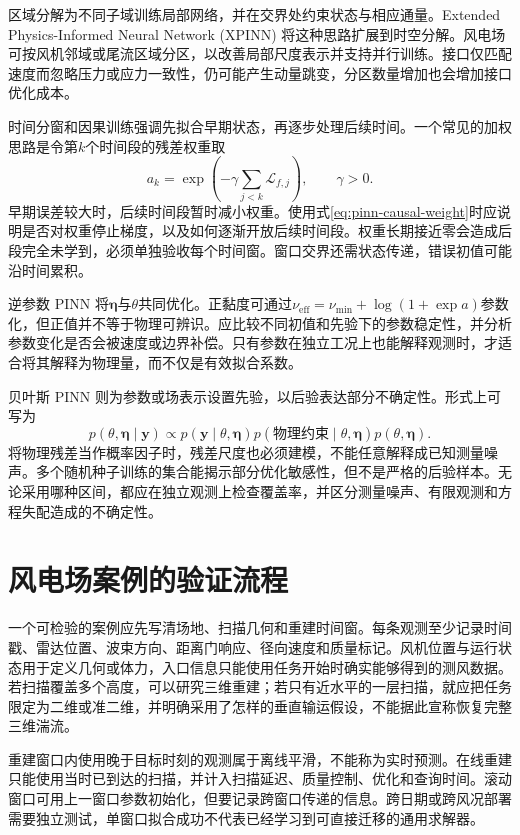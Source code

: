 区域分解为不同子域训练局部网络，并在交界处约束状态与相应通量。Extended Physics-Informed Neural Network (XPINN) 将这种思路扩展到时空分解\cite{jagtap2020xpinn}。风电场可按风机邻域或尾流区域分区，以改善局部尺度表示并支持并行训练。接口仅匹配速度而忽略压力或应力一致性，仍可能产生动量跳变，分区数量增加也会增加接口优化成本。

时间分窗和因果训练强调先拟合早期状态，再逐步处理后续时间。一个常见的加权思路是令第$k$个时间段的残差权重取
\begin{equation}
 a_k=\exp\left(-\gamma\sum_{j<k}\mathcal L_{f,j}\right),\qquad \gamma>0.\label{eq:pinn-causal-weight}
\end{equation}
早期误差较大时，后续时间段暂时减小权重。使用式\eqref{eq:pinn-causal-weight}时应说明是否对权重停止梯度，以及如何逐渐开放后续时间段。权重长期接近零会造成后段完全未学到，必须单独验收每个时间窗。窗口交界还需状态传递，错误初值可能沿时间累积。

逆参数 PINN 将$\boldsymbol\eta$与$\theta$共同优化。正黏度可通过$\nu_{\mathrm{eff}}=\nu_{\min}+\log(1+\exp a)$参数化，但正值并不等于物理可辨识。应比较不同初值和先验下的参数稳定性，并分析参数变化是否会被速度或边界补偿。只有参数在独立工况上也能解释观测时，才适合将其解释为物理量，而不仅是有效拟合系数。

贝叶斯 PINN 则为参数或场表示设置先验，以后验表达部分不确定性\cite{yang2021bpinn}。形式上可写为
\begin{equation}
 p(\theta,\boldsymbol\eta\mid\mathbf y)
 \propto p(\mathbf y\mid\theta,\boldsymbol\eta)
 p(\text{物理约束}\mid\theta,\boldsymbol\eta)
 p(\theta,\boldsymbol\eta).
\end{equation}
将物理残差当作概率因子时，残差尺度也必须建模，不能任意解释成已知测量噪声。多个随机种子训练的集合能揭示部分优化敏感性，但不是严格的后验样本。无论采用哪种区间，都应在独立观测上检查覆盖率，并区分测量噪声、有限观测和方程失配造成的不确定性。

\section{风电场案例的验证流程}
\label{sec:pinn-validation}
一个可检验的案例应先写清场地、扫描几何和重建时间窗。每条观测至少记录时间戳、雷达位置、波束方向、距离门响应、径向速度和质量标记。风机位置与运行状态用于定义几何或体力，入口信息只能使用任务开始时确实能够得到的测风数据。若扫描覆盖多个高度，可以研究三维重建；若只有近水平的一层扫描，就应把任务限定为二维或准二维，并明确采用了怎样的垂直输运假设，不能据此宣称恢复完整三维湍流。

重建窗口内使用晚于目标时刻的观测属于离线平滑，不能称为实时预测。在线重建只能使用当时已到达的扫描，并计入扫描延迟、质量控制、优化和查询时间。滚动窗口可用上一窗口参数初始化，但要记录跨窗口传递的信息。跨日期或跨风况部署需要独立测试，单窗口拟合成功不代表已经学习到可直接迁移的通用求解器。

